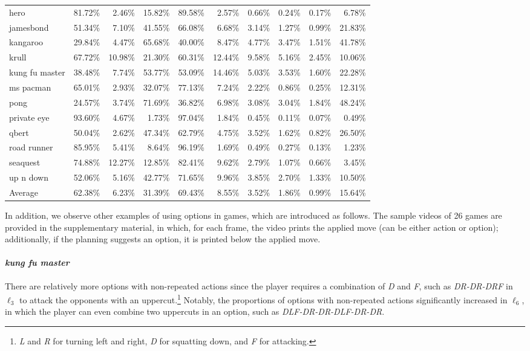 \begin{table}[h!]
{\begin{tabular}{l|rrr|rrrrrr}
        hero & 81.72\% & 2.46\% & 15.82\% & 89.58\% & 2.57\% & 0.66\% & 0.24\% & 0.17\% & 6.78\% \\
        jamesbond & 51.34\% & 7.10\% & 41.55\% & 66.08\% & 6.68\% & 3.14\% & 1.27\% & 0.99\% & 21.83\% \\
        kangaroo & 29.84\% & 4.47\% & 65.68\% & 40.00\% & 8.47\% & 4.77\% & 3.47\% & 1.51\% & 41.78\% \\
        krull & 67.72\% & 10.98\% & 21.30\% & 60.31\% & 12.44\% & 9.58\% & 5.16\% & 2.45\% & 10.06\% \\
        kung fu master & 38.48\% & 7.74\% & 53.77\% & 53.09\% & 14.46\% & 5.03\% & 3.53\% & 1.60\% & 22.28\% \\
        ms pacman & 65.01\% & 2.93\% & 32.07\% & 77.13\% & 7.24\% & 2.22\% & 0.86\% & 0.25\% & 12.31\% \\
        pong & 24.57\% & 3.74\% & 71.69\% & 36.82\% & 6.98\% & 3.08\% & 3.04\% & 1.84\% & 48.24\% \\
        private eye & 93.60\% & 4.67\% & 1.73\% & 97.04\% & 1.84\% & 0.45\% & 0.11\% & 0.07\% & 0.49\% \\
        qbert & 50.04\% & 2.62\% & 47.34\% & 62.79\% & 4.75\% & 3.52\% & 1.62\% & 0.82\% & 26.50\% \\
        road runner & 85.95\% & 5.41\% & 8.64\% & 96.19\% & 1.69\% & 0.49\% & 0.27\% & 0.13\% & 1.23\% \\
        seaquest & 74.88\% & 12.27\% & 12.85\% & 82.41\% & 9.62\% & 2.79\% & 1.07\% & 0.66\% & 3.45\% \\
        up n down & 52.06\% & 5.16\% & 42.77\% & 71.65\% & 9.96\% & 3.85\% & 2.70\% & 1.33\% & 10.50\% \\
        \midrule
        Average & 62.38\% & 6.23\% & 31.39\% & 69.43\% & 8.55\% & 3.52\% & 1.86\% & 0.99\% & 15.64\% \\
        \bottomrule
    \end{tabular}
    }
    \label{tab:option-length-op3-op6}
\end{table}

\clearpage

In addition, we observe other examples of using options in games, which are introduced as follows.
The sample videos of 26 games are provided in the supplementary material, in which, for each frame, the video prints the applied move (can be either action or option); additionally, if the planning suggests an option, it is printed below the applied move.

\paragraph{\textit{kung fu master}}
There are relatively more options with non-repeated actions since the player requires a combination of \textit{D} and \textit{F}, such as \textit{DR-DR-DRF} in $\ell_3$ to attack the opponents with an uppercut.\footnote{\textit{L} and \textit{R} for turning left and right, \textit{D} for squatting down, and \textit{F} for attacking.}
Notably, the proportions of options with non-repeated actions significantly increased in $\ell_6$, in which the player can even combine two uppercuts in an option, such as \textit{DLF-DR-DR-DLF-DR-DR}.

